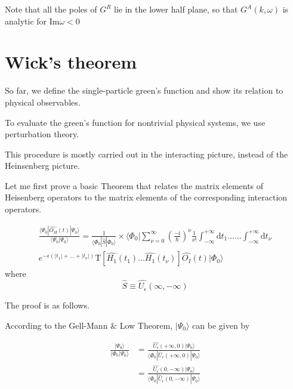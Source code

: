 Note that all the poles of $G^R$ lie in the lower half plane, so that $G^A(k,\omega)$ is analytic for $\mathrm{Im} \omega<0$



\section{Wick's theorem}

So far, we define the single-particle green's function and show its relation to physical observables.

To evaluate the green's function for nontrivial physical systems, we use perturbation theory.

This procedure is mostly carried out in the interacting picture, instead of the Heinsenberg picture.

Let me first prove a basic Theorem that relates the matrix elements of Heisenberg operators to the matrix elements of the corresponding interaction operators.


\begin{align}\label{2.4.1}
\frac{\langle\Psi_0|\hat{O_H}(t)|\Psi_0\rangle}{\langle\Psi_0|\Psi_0\rangle}=\frac{1}{\langle\Phi_0|\hat{S}|\Phi_0\rangle}\times \langle\Phi_0|\sum_{\nu=0}^{\infty}(\frac{-\mathrm{i}}{\hbar})^{\nu} \frac{1}{\nu!} \int_{-\infty}^{+\infty}\mathrm{d}t_1......\int_{-\infty}^{+\infty}\mathrm{d}t_{\nu} \nonumber \\
e^{-\epsilon(|t_1|+...+|t_{\nu}|)}\mathrm{T}[\hat{H_1}(t_1)...\hat{H_1}(t_{\nu})]\hat{O_I}(t)|\Phi_0\rangle
\end{align}
where 
\begin{equation}\label{2.4.2}
\hat{S}\equiv\hat{U_{\epsilon}}(\infty,-\infty)
\end{equation}

The proof is as follows.

According to the Gell-Mann \& Low Theorem, $|\Psi_0\rangle$ can be given by

\begin{align}
\frac{|\Psi_0\rangle}{\langle\Phi_0|\Psi_0\rangle}&=\frac{\hat{U_{\epsilon}}(+\infty,0)|\Psi_0\rangle}{\langle\Phi_0|\hat U_{\epsilon}(+\infty,0)|\Psi_0\rangle} \nonumber \\
&=\frac{\hat{U_{\epsilon}}(0,-\infty)|\Psi_0\rangle}{\langle\Phi_0|\hat U_{\epsilon}(0,-\infty)|\Psi_0\rangle} \nonumber
\end{align}

